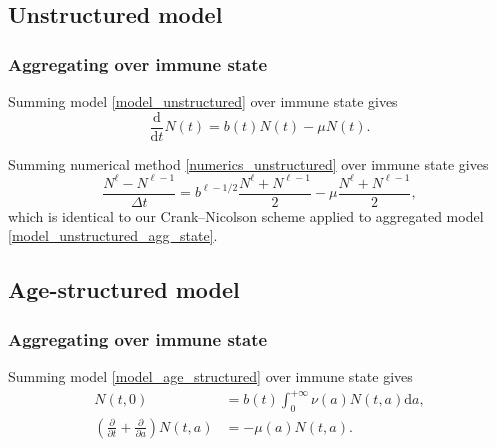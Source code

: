 \documentclass[USenglish]{article}
\newcommand{\md}{\mathrm{d}}
\begin{document}
\subsection{Unstructured model}


\subsubsection{Aggregating over immune state}

Summing model \eqref{model_unstructured} over immune state gives
\begin{equation}
  \label{model_unstructured_agg_state}
  \frac{\md}{\md t} N(t)
  = b(t) N(t) - \mu N(t).
\end{equation}

Summing numerical method \eqref{numerics_unstructured} over
immune state gives
\begin{equation}
  \label{numerics_unstructured_agg_state}
  \frac{N^{\ell} - N^{\ell - 1}}{\Delta t}
  = b^{\ell - 1 / 2} \frac{N^{\ell} + N^{\ell - 1}}{2}
  - \mu \frac{N^{\ell} + N^{\ell - 1}}{2},
\end{equation}
which is identical to our Crank--Nicolson scheme applied to aggregated
model \eqref{model_unstructured_agg_state}.


\subsection{Age-structured model}


\subsubsection{Aggregating over immune state}

Summing model \eqref{model_age_structured} over immune state gives
\begin{subequations}
  \label{model_age_structured_agg_state}
  \begin{align}
    N(t, 0)
    &= b(t) \int_0^{+\infty} \nu(a) N(t, a) \md a,
    \\
    \left(\frac{\partial}{\partial t}
      + \frac{\partial}{\partial a}\right)
    N(t, a)
    &= - \mu(a) N(t, a).
  \end{align}
\end{subequations}
\end{document}
